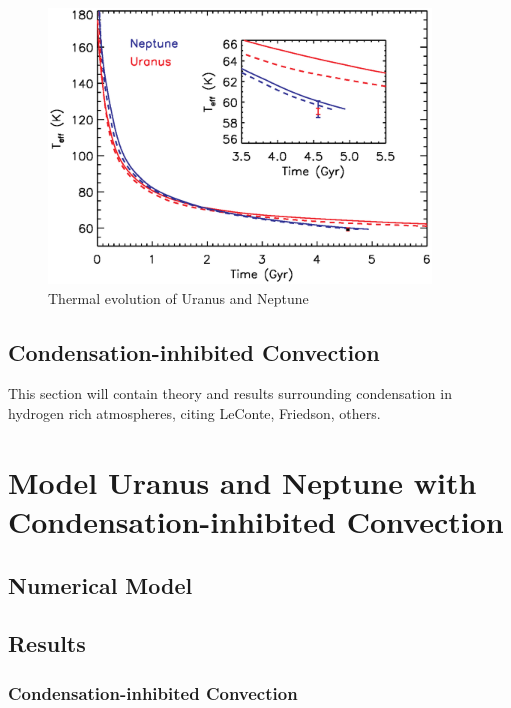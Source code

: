 \documentclass[11pt]{ucscthesisbs}
\begin{document}
\begin{figure}[ht!]
 \centerline{
  \includegraphics[width=4.0in]{figures/f10.eps}
 }
\caption[This is just a placeholder for our own plot]
{Thermal evolution of Uranus and Neptune 
}

\label{fig:discretescan}
\end{figure}


\section{Condensation-inhibited Convection}\label{condensation_background}

This section will contain theory and results surrounding condensation in hydrogen rich atmospheres, citing LeConte, Friedson, others.


\chapter{Model Uranus and Neptune with Condensation-inhibited Convection}

\section{Numerical Model}

\section{Results}

\subsection{Condensation-inhibited Convection}
\end{document}
